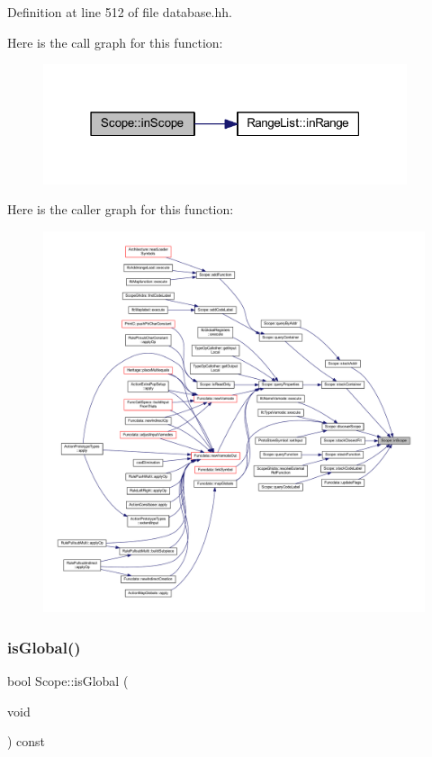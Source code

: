 Definition at line 512 of file database.\+hh.

Here is the call graph for this function\+:
\nopagebreak
\begin{figure}[H]
\begin{center}
\leavevmode
\includegraphics[width=303pt]{class_scope_a4fcaec6d7678dabe548680747d843a52_cgraph}
\end{center}
\end{figure}
Here is the caller graph for this function\+:
\nopagebreak
\begin{figure}[H]
\begin{center}
\leavevmode
\includegraphics[width=350pt]{class_scope_a4fcaec6d7678dabe548680747d843a52_icgraph}
\end{center}
\end{figure}
\mbox{\label{class_scope_a67739f460d64dd75bfd1f2391c95ee0d}} 
\subsubsection{\texorpdfstring{isGlobal()}{isGlobal()}}
{\footnotesize\ttfamily bool Scope\+::is\+Global (\begin{DoxyParamCaption}\item[{void}]{ }\end{DoxyParamCaption}) const\hspace{0.3cm}{\ttfamily [inline]}}



